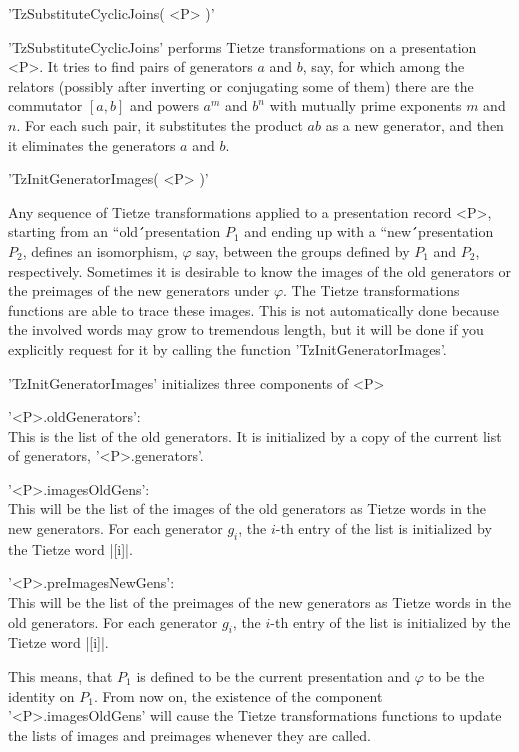 \vspace{5mm}
'TzSubstituteCyclicJoins( <P> )'%

'TzSubstituteCyclicJoins'    performs   Tietze   transformations   on   a
presentation <P>.  It tries to find pairs of generators $a$ and $b$, say,
for which among  the  relators (possibly after  inverting  or conjugating
some of them) there are the commutator $[a,b]$ and powers $a^m$ and $b^n$
with mutually  prime exponents  $m$ and  $n$.   For each  such  pair,  it
substitutes the product $ab$  as  a new generator, and then it eliminates
the generators $a$ and $b$.

\vspace{5mm}
'TzInitGeneratorImages( <P> )'%

Any sequence of Tietze  transformations applied to a presentation  record
<P>, starting from an ``old\'\'\ presentation $P_1$ and  ending up with a
``new\'\'\  presentation  $P_2$, defines an   isomorphism, $\varphi$ say,
between the  groups defined by  $P_1$ and $P_2$, respectively.  Sometimes
it is desirable to know the images of the old generators or the preimages
of the new generators under $\varphi$.  The {\GAP} Tietze transformations
functions are able to trace these images.  This is not automatically done
because the involved words may grow to  tremendous length, but it will be
done  if you    explicitly   request for   it  by  calling  the  function
'TzInitGeneratorImages'.

'TzInitGeneratorImages' initializes three components of <P>{\:}

'<P>.oldGenerators': \\
        This is the  list of the old generators.  It is initialized  by a
        copy of the current list of generators, '<P>.generators'.

'<P>.imagesOldGens': \\
        This  will be  the list  of the images  of the  old generators as
        Tietze words in the new generators. For each generator $g_i$, the
        $i$-th entry of the list is initialized by the Tietze word |[i]|.

'<P>.preImagesNewGens': \\
        This will be the  list of the  preimages of the new generators as
        Tietze words in the old generators. For each generator $g_i$, the
        $i$-th entry of the list is initialized by the Tietze word |[i]|.

This means, that  $P_1$ is  defined  to be the  current presentation  and
$\varphi$ to be the identity on $P_1$. From now  on, the existence of the
component  '<P>.imagesOldGens'   will  cause the  Tietze  transformations
functions to update  the lists of images and  preimages whenever they are
called.

